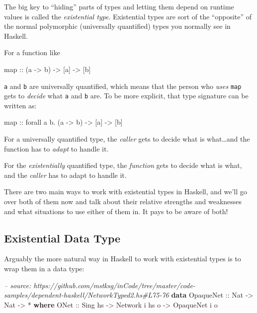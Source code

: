 \documentclass[]{article}
\newenvironment{Shaded}{}{}
\newcommand{\KeywordTok}[1]{\textcolor[rgb]{0.00,0.44,0.13}{\textbf{{#1}}}}
\newcommand{\DataTypeTok}[1]{\textcolor[rgb]{0.56,0.13,0.00}{{#1}}}
\newcommand{\CommentTok}[1]{\textcolor[rgb]{0.38,0.63,0.69}{\textit{{#1}}}}
\newcommand{\OtherTok}[1]{\textcolor[rgb]{0.00,0.44,0.13}{{#1}}}
\newcommand{\FunctionTok}[1]{\textcolor[rgb]{0.02,0.16,0.49}{{#1}}}
\newcommand{\NormalTok}[1]{{#1}}
\begin{document}
The big key to ``hiding'' parts of types and letting them depend on runtime
values is called the \emph{existential type}. Existential types are sort of the
``opposite'' of the normal polymorphic (universally quantified) types you
normally see in Haskell.

For a function like

\begin{Shaded}
\begin{Highlighting}[]
\NormalTok{map}\OtherTok{ ::} \NormalTok{(a }\OtherTok{->} \NormalTok{b) }\OtherTok{->} \NormalTok{[a] }\OtherTok{->} \NormalTok{[b]}
\end{Highlighting}
\end{Shaded}

\texttt{a} and \texttt{b} are universally quantified, which means that the
person who \emph{uses} \texttt{map} gets to \emph{decide} what \texttt{a} and
\texttt{b} are. To be more explicit, that type signature can be written as:

\begin{Shaded}
\begin{Highlighting}[]
\NormalTok{map}\OtherTok{ ::} \NormalTok{forall a b}\FunctionTok{.} \NormalTok{(a }\OtherTok{->} \NormalTok{b) }\OtherTok{->} \NormalTok{[a] }\OtherTok{->} \NormalTok{[b]}
\end{Highlighting}
\end{Shaded}

For a universally quantified type, the \emph{caller} gets to decide what is
what\ldots{}and the function has to \emph{adapt} to handle it.

For the \emph{existentially} quantified type, the \emph{function} gets to decide
what is what, and the \emph{caller} has to adapt to handle it.

There are two main ways to work with existential types in Haskell, and we'll go
over both of them now and talk about their relative strengths and weaknesses and
what situations to use either of them in. It pays to be aware of both!

\subsection{Existential Data Type}\label{existential-data-type}

Arguably the more natural way in Haskell to work with existential types is to
wrap them in a data type:

\begin{Shaded}
\begin{Highlighting}[]
\CommentTok{-- source: https://github.com/mstksg/inCode/tree/master/code-samples/dependent-haskell/NetworkTyped2.hs#L75-76}
\KeywordTok{data} \DataTypeTok{OpaqueNet}\OtherTok{ ::} \DataTypeTok{Nat} \OtherTok{->} \DataTypeTok{Nat} \OtherTok{->} \FunctionTok{*} \KeywordTok{where}
    \DataTypeTok{ONet}\OtherTok{ ::} \DataTypeTok{Sing} \NormalTok{hs }\OtherTok{->} \DataTypeTok{Network} \NormalTok{i hs o }\OtherTok{->} \DataTypeTok{OpaqueNet} \NormalTok{i o}
\end{Highlighting}
\end{Shaded}
\end{document}
